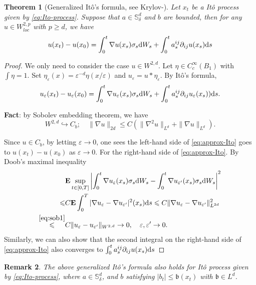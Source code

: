 \documentclass[twoside, 12pt]{book}
\numberwithin{equation}{chapter}
\newtheorem{theorem}{Theorem}[section]
\newtheorem{remark}[theorem]{Remark}
\def\mS{{\mathbb S}}
\def\bE{{\mathbf E}}
\def\l{\left}
\def\r{\right}
\def\geq{\geqslant}
\def\leq{\leqslant}
\def\p{\partial}
\def\d{\text{\rm{d}}}
\def\eps{\varepsilon}
\begin{document}
	\begin{theorem}[Generalized Itô's formula,  see Krylov-\cite{krylov1980controlled}]
		Let $x_t$ be a  It\^o process given by \eqref{eq:Ito-process}. Suppose that $a\in \mS^d_\delta$ and $b$ are bounded, then for any $u\in W^{2,p}_{loc}$ with $p\geq d$, we have 
		\begin{equation}
			u(x_t)-u(x_0)=\int_0^t \nabla u(x_s)\sigma_s \d W_s+ \int_0^t a_s^{ij} \p_{ij}u(x_s)\d s 
		\end{equation}
	\end{theorem}
	\begin{proof}
		We only need to consider the case $u\in W^{2,d}$. 
		Let $\eta\in C_c^\infty(B_1)$ with $\int\eta=1$. Set $\eta_\eps(x)=\eps^{-d} \eta(x/\eps)$ and $u_\eps=u*\eta_\eps$. By It\^o's formula, 
		\begin{equation}\label{eq:approx-Ito}
			u_\eps(x_t)-u_\eps(x_0)=\int_0^t \nabla u_\eps (x_s)\sigma_s \d W_s+ \int_0^t a_s^{ij} \p_{ij}u_\eps(x_s) ) \d s. 
		\end{equation}
		\begin{framed}
			{\bf Fact}: by Sobolev embedding theorem, we have  
			\begin{equation}\label{eq:sob1}
				W^{2,d}\hookrightarrow C_b; \quad \|\nabla u\|_{2d} \leq C (\|\nabla^2 u\|_{L^d} + \|\nabla u\|_{L^d}) . 
			\end{equation}
		\end{framed}
		Since $u\in C_b$, by letting $\eps\to0$, one sees the left-hand side of \eqref{eq:approx-Ito} goes to $u(x_t)-u(x_0)$ as $\eps\to0$. For the right-hand side of \eqref{eq:approx-Ito}. 
		By Doob's maximal inequality
		\[
		\begin{aligned}
			&\bE \sup_{t\in [0,T]} \l|\int_0^t \nabla u_\eps (x_s)\sigma_s \d W_s -\int_0^t \nabla u_{\eps'} (x_s)\sigma_s \d W_s\r|^2\\
			\leq & C \bE \int_0^T |\nabla u_\eps- \nabla u_{\eps'}|^2 (x_s) \d s \leq C \|\nabla u_\eps -\nabla u_{\eps'}\|^2_{L^{2d}}\\
			\overset{\eqref{eq:sob1}}{\leq} & C \|u_\eps - u_{\eps'}\|_{W^{2,d}} \to 0, \quad \eps,\eps'\to0. 
		\end{aligned}
		\]
		Similarly, we can also show that the second integral on the right-hand side of \eqref{eq:approx-Ito} also converges to $ \int_0^t a_s^{ij} \p_{ij}u(x_s)  \d s$
	\end{proof}

 \begin{remark}
     The above generalized It\^o's formula also holds for Itô process given by \eqref{eq:Ito-process}, where $a\in \mS^d_\delta$, and $b$ satisfying $|b_t|\leq \mathfrak{b}(x_t)$ with $\mathfrak{b}\in L^d$. 
 \end{remark}
  
\end{document}
